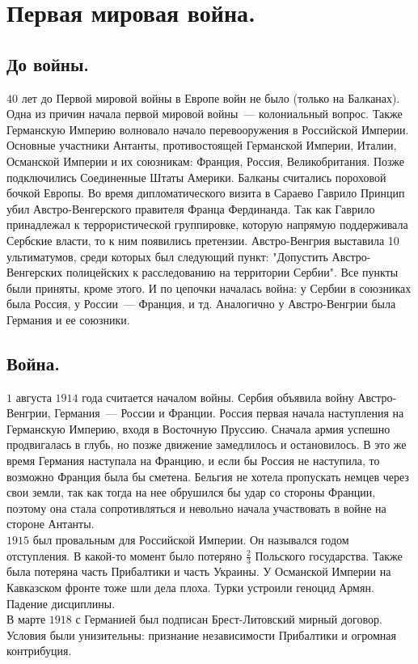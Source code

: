 \documentclass{article}
\begin{document}
	\tableofcontents
	\setcounter{tocdepth}{3}
	\newpage
	\section{Первая мировая война.}
	\subsection{До войны.}
	$40$ лет до Первой мировой войны в Европе войн не было (только на Балканах). Одна из причин начала первой мировой войны~--- колониальный вопрос. Также Германскую Империю волновало начало перевооружения в Российской Империи. Основные участники Антанты, противостоящей Германской Империи, Италии, Османской Империи и их союзникам: Франция, Россия, Великобритания. Позже подключились Соединенные Штаты Америки. Балканы считались пороховой бочкой Европы. Во время дипломатического визита в Сараево Гаврило Принцип убил Австро-Венгерского правителя Франца Фердинанда. Так как Гаврило принадлежал к террористической группировке, которую напрямую поддерживала Сербские власти, то к ним появились претензии. Австро-Венгрия выставила 10 ультиматумов, среди которых был следующий пункт: "Допустить Австро-Венгерских полицейских к расследованию на территории Сербии". Все пункты были приняты, кроме этого. И по цепочки началась война: у Сербии в союзниках была Россия, у России~--- Франция, и тд. Аналогично у Австро-Венгрии была Германия и ее союзники.
	\subsection{Война.}
	$1$ августа $1914$ года считается началом войны. Сербия объявила войну Австро-Венгрии, Германия~--- России и Франции. Россия первая начала наступления на Германскую Империю, входя в Восточную Пруссию. Сначала армия успешно продвигалась в глубь, но позже движение замедлилось и остановилось. В это же время Германия наступала на Францию, и если бы Россия не наступила, то возможно Франция была бы сметена. Бельгия не хотела пропускать немцев через свои земли, так как тогда на нее обрушился бы удар со стороны Франции, поэтому она стала сопротивляться и невольно начала участвовать в войне на стороне Антанты. \\
	$1915$ был провальным для Российской Империи. Он назывался годом отступления. В какой-то момент было потеряно $\frac{2}{3}$ Польского государства. Также была потеряна часть Прибалтики и часть Украины. У Османской Империи на Кавказском фронте тоже шли дела плоха. Турки устроили геноцид Армян. Падение дисциплины. \\
	В марте $1918$ с Германией был подписан Брест-Литовский мирный договор. Условия были унизительны: признание независимости Прибалтики и огромная контрибуция.
\end{document}
